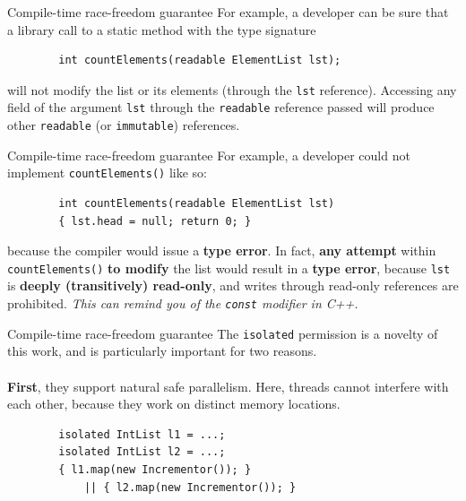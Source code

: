 \documentclass{beamer}
\begin{document}

\begin{frame}[fragile]{Compile-time race-freedom guarantee}
	For example, a developer can be sure that a library call to a static
	method with the type signature
	\begin{lstlisting}
		int countElements(readable ElementList lst);
	\end{lstlisting}
	will not modify the list or its elements (through the \texttt{lst}
	reference).	Accessing any field of the argument \texttt{lst} through
	the \texttt{readable} reference passed will produce other \texttt{readable}
	(or \texttt{immutable}) references.
\end{frame}

\begin{frame}[fragile]{Compile-time race-freedom guarantee}
	For example, a developer could not	implement \texttt{countElements()}
	like so:
	\begin{lstlisting}
		int countElements(readable ElementList lst)
		{ lst.head = null; return 0; }
	\end{lstlisting}
	because the compiler would issue a \textbf{type error}. In fact,
	\textbf{any	attempt} within \texttt{countElements()} \textbf{to modify}
	the	list would result in a \textbf{type error}, because \texttt{lst} is
	\textbf{deeply (transitively) read-only}, and writes through read-only
	references are prohibited.
	\vfill
	\textit{This can remind you of the \texttt{const} modifier in C++.}
\end{frame}


\begin{frame}[fragile]{Compile-time race-freedom guarantee}
	The \texttt{isolated} permission is a novelty of this work, and
	is particularly important for two reasons.\\
	\pause ~\\
	\textbf{First}, they support natural safe parallelism. Here, threads
	cannot interfere with each other, because they work on distinct memory
	locations.
	\begin{lstlisting}
		isolated IntList l1 = ...;
		isolated IntList l2 = ...;
		{ l1.map(new Incrementor()); }
			|| { l2.map(new Incrementor()); }
	\end{lstlisting}
\end{frame}
\end{document}
